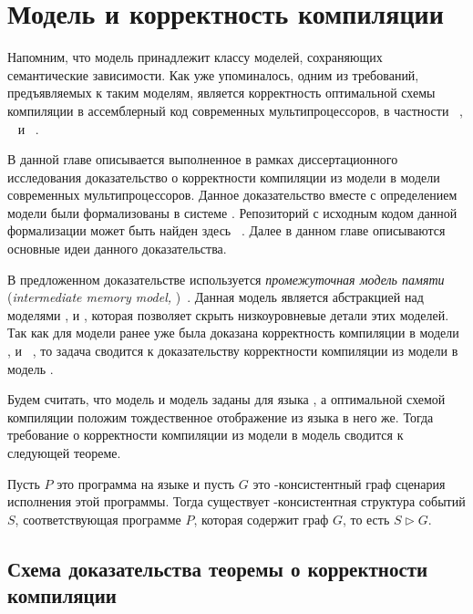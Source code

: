 \chapter{Модель \Wkm и корректность компиляции}
\label{ch:weakestmo-imm}

Напомним, что модель \Wkm принадлежит классу моделей,
сохраняющих семантические зависимости.
Как уже упоминалось, одним из требований, предъявляемых к таким моделям,
является корректность оптимальной схемы компиляции
в ассемблерный код современных мультипроцессоров,
в частности \Intel~\cite{Sewell-al:CACM10},
\ARM~\cite{Pulte-al:POPL18} и \POWER~\cite{Alglave-al:TOPLAS14}.

В данной главе описывается выполненное в рамках
диссертационного исследования доказательство
о корректности компиляции из модели \Wkm в модели
современных мультипроцессоров.
Данное доказательство вместе с определением модели \Wkm
были формализованы в системе \coq.
Репозиторий с исходным кодом данной формализации
может быть найден здесь~%
\cite{Coq:Weakestmo}.
Далее в данном главе описываются основные идеи данного доказательства.

В предложенном доказательстве используется \emph{промежуточная модель памяти}
(\emph{intermediate memory model, \IMM})~\cite{Podkopaev-al:POPL19}.
Данная модель является абстракцией над моделями \Intel, \ARM и \POWER,
которая позволяет скрыть низкоуровневые детали этих моделей.
Так как для модели \IMM ранее уже была доказана
корректность компиляции в модели \Intel, \ARM и \POWER~\cite{Podkopaev-al:POPL19}, 
то задача сводится к доказательству корректности компиляции из модели \Wkm в модель \IMM. 

Будем считать, что модель \Wkm и модель \IMM заданы для языка \LLANG,
а оптимальной схемой компиляции положим
тождественное отображение из языка \LLANG в него же.
Тогда требование о корректности компиляции
из модели \Wkm в модель \IMM сводится к следующей теореме. 

\begin{theorem}
  \label{thm:main}
  Пусть $P$ это программа на языке \LLANG
  и пусть $G$ это \IMM-консистентный граф сценария исполнения этой программы.
  Тогда существует \Wkm-консистентная структура событий $S$,
  соответствующая программе $P$,
  которая содержит граф $G$, то есть $S \rhd G$.
\end{theorem}


\section{Схема доказательства теоремы о корректности компиляции}

